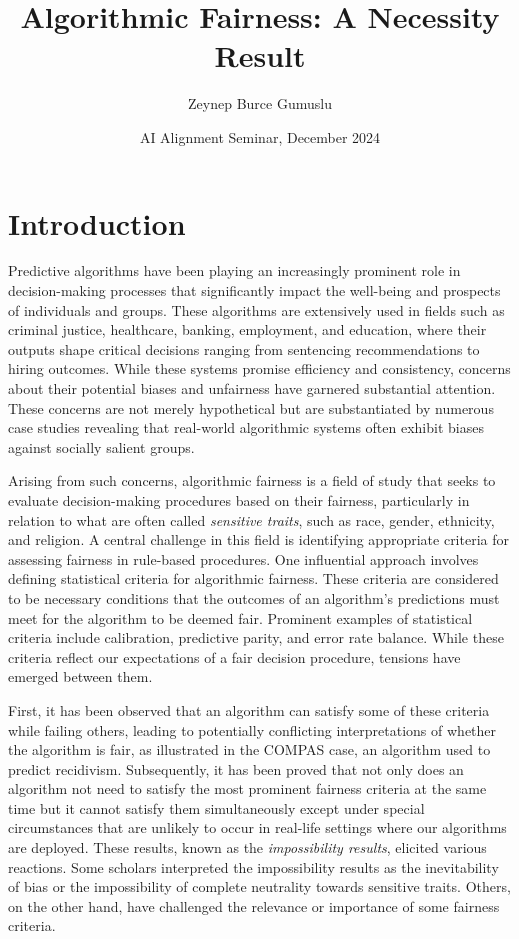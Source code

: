 \documentclass{article}
\title{Algorithmic Fairness: A Necessity Result}
\author{Zeynep Burce Gumuslu}
\date{AI Alignment Seminar, December 2024}
\begin{document}
\maketitle
\section{Introduction}


Predictive algorithms have been playing an increasingly prominent role in decision-making processes that significantly impact the well-being and prospects of individuals and groups. These algorithms are extensively used in fields such as criminal justice, healthcare, banking, employment, and education, where their outputs shape critical decisions ranging from sentencing recommendations to hiring outcomes. While these systems promise efficiency and consistency, concerns about their potential biases and unfairness have garnered substantial attention. These concerns are not merely hypothetical but are substantiated by numerous case studies revealing that real-world algorithmic systems often exhibit biases against socially salient groups.

Arising from such concerns, algorithmic fairness is a field of study that seeks to evaluate decision-making procedures based on their fairness, particularly in relation to what are often called \textit{sensitive traits}, such as race, gender, ethnicity, and religion. A central challenge in this field is identifying appropriate criteria for assessing fairness in rule-based procedures. One influential approach involves defining statistical criteria for algorithmic fairness. These criteria are considered to be necessary conditions that the outcomes of an algorithm’s predictions must meet for the algorithm to be deemed fair. Prominent examples of statistical criteria include calibration, predictive parity, and error rate balance. While these criteria reflect our expectations of a fair decision procedure, tensions have emerged between them.

First, it has been observed that an algorithm can satisfy some of these criteria while failing others, leading to potentially conflicting interpretations of whether the algorithm is fair, as illustrated in the COMPAS case, an algorithm used to predict recidivism. Subsequently, it has been proved that not only does an algorithm not need to satisfy the most prominent fairness criteria at the same time but it cannot satisfy them simultaneously except under special circumstances that are unlikely to occur in real-life settings where our algorithms are deployed. These results, known as the \textit{impossibility results}, elicited various reactions. Some scholars interpreted the impossibility results as the inevitability of bias or the impossibility of complete neutrality towards sensitive traits. Others, on the other hand, have challenged the relevance or importance of some fairness criteria. 
\end{document}
